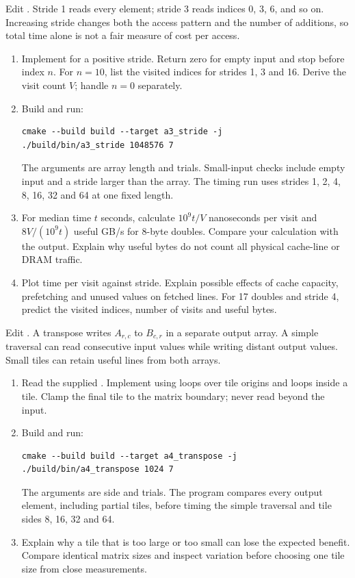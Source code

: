 Edit . Stride 1 reads every element; stride 3 reads indices
0, 3, 6, and so on. Increasing stride changes both the access pattern and the
number of additions, so total time alone is not a fair measure of cost per access.
\begin{enumerate}
\item Implement  for a positive stride. Return zero for empty
input and stop before index $n$. For $n=10$, list the visited indices for strides
1, 3 and 16. Derive the visit count $V$; handle $n=0$ separately.
\item Build and run:
\begin{lstlisting}[style=shell]
cmake --build build --target a3_stride -j
./build/bin/a3_stride 1048576 7
\end{lstlisting}
The arguments are array length and trials. Small-input checks include empty
input and a stride larger than the array. The timing run uses strides
1, 2, 4, 8, 16, 32 and 64 at one fixed length.
\item For median time $t$ seconds, calculate $10^9t/V$ nanoseconds per visit
and $8V/(10^9t)$ useful GB/s for 8-byte doubles. Compare your calculation with
the output. Explain why useful bytes do not count all physical cache-line or
DRAM traffic.
\item Plot time per visit against stride. Explain possible effects of cache
capacity, prefetching and unused values on fetched lines. For 17 doubles and
stride 4, predict the visited indices, number of visits and useful bytes.
\end{enumerate}

Edit . A transpose writes $A_{r,c}$ to $B_{c,r}$ in a
separate output array. A simple traversal can read consecutive input values while
writing distant output values. Small tiles can retain useful lines from both arrays.
\begin{enumerate}
\item Read the supplied . Implement
 using loops over tile origins and loops inside a tile.
Clamp the final tile to the matrix boundary; never read beyond the input.
\item Build and run:
\begin{lstlisting}[style=shell]
cmake --build build --target a4_transpose -j
./build/bin/a4_transpose 1024 7
\end{lstlisting}
The arguments are side and trials. The program compares every output element,
including partial tiles, before timing the simple traversal and tile sides
8, 16, 32 and 64.
\item Explain why a tile that is too large or too small can lose the expected
benefit. Compare identical matrix sizes and inspect variation before choosing
one tile size from close measurements.
\end{enumerate}
